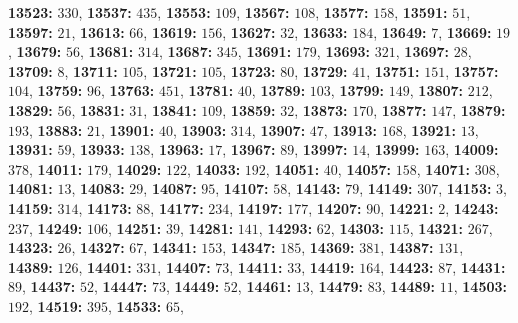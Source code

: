 \textsf{\bfseries 13523:} $330$, \textsf{\bfseries 13537:} $435$, \textsf{\bfseries 13553:} $109$, \textsf{\bfseries 13567:} $108$, \textsf{\bfseries 13577:} $158$, \textsf{\bfseries 13591:} $51$, \textsf{\bfseries 13597:} $21$, \textsf{\bfseries 13613:} $66$, \textsf{\bfseries 13619:} $156$, \textsf{\bfseries 13627:} $32$, \textsf{\bfseries 13633:} $184$, \textsf{\bfseries 13649:} $7$, \textsf{\bfseries 13669:} $19$, \textsf{\bfseries 13679:} $56$, \textsf{\bfseries 13681:} $314$, \textsf{\bfseries 13687:} $345$, \textsf{\bfseries 13691:} $179$, \textsf{\bfseries 13693:} $321$, \textsf{\bfseries 13697:} $28$, \textsf{\bfseries 13709:} $8$, \textsf{\bfseries 13711:} $105$, \textsf{\bfseries 13721:} $105$, \textsf{\bfseries 13723:} $80$, \textsf{\bfseries 13729:} $41$, \textsf{\bfseries 13751:} $151$, \textsf{\bfseries 13757:} $104$, \textsf{\bfseries 13759:} $96$, \textsf{\bfseries 13763:} $451$, \textsf{\bfseries 13781:} $40$, \textsf{\bfseries 13789:} $103$, \textsf{\bfseries 13799:} $149$, \textsf{\bfseries 13807:} $212$, \textsf{\bfseries 13829:} $56$, \textsf{\bfseries 13831:} $31$, \textsf{\bfseries 13841:} $109$, \textsf{\bfseries 13859:} $32$, \textsf{\bfseries 13873:} $170$, \textsf{\bfseries 13877:} $147$, \textsf{\bfseries 13879:} $193$, \textsf{\bfseries 13883:} $21$, \textsf{\bfseries 13901:} $40$, \textsf{\bfseries 13903:} $314$, \textsf{\bfseries 13907:} $47$, \textsf{\bfseries 13913:} $168$, \textsf{\bfseries 13921:} $13$, \textsf{\bfseries 13931:} $59$, \textsf{\bfseries 13933:} $138$, \textsf{\bfseries 13963:} $17$, \textsf{\bfseries 13967:} $89$, \textsf{\bfseries 13997:} $14$, \textsf{\bfseries 13999:} $163$, \textsf{\bfseries 14009:} $378$, \textsf{\bfseries 14011:} $179$, \textsf{\bfseries 14029:} $122$, \textsf{\bfseries 14033:} $192$, \textsf{\bfseries 14051:} $40$, \textsf{\bfseries 14057:} $158$, \textsf{\bfseries 14071:} $308$, \textsf{\bfseries 14081:} $13$, \textsf{\bfseries 14083:} $29$, \textsf{\bfseries 14087:} $95$, \textsf{\bfseries 14107:} $58$, \textsf{\bfseries 14143:} $79$, \textsf{\bfseries 14149:} $307$, \textsf{\bfseries 14153:} $3$, \textsf{\bfseries 14159:} $314$, \textsf{\bfseries 14173:} $88$, \textsf{\bfseries 14177:} $234$, \textsf{\bfseries 14197:} $177$, \textsf{\bfseries 14207:} $90$, \textsf{\bfseries 14221:} $2$, \textsf{\bfseries 14243:} $237$, \textsf{\bfseries 14249:} $106$, \textsf{\bfseries 14251:} $39$, \textsf{\bfseries 14281:} $141$, \textsf{\bfseries 14293:} $62$, \textsf{\bfseries 14303:} $115$, \textsf{\bfseries 14321:} $267$, \textsf{\bfseries 14323:} $26$, \textsf{\bfseries 14327:} $67$, \textsf{\bfseries 14341:} $153$, \textsf{\bfseries 14347:} $185$, \textsf{\bfseries 14369:} $381$, \textsf{\bfseries 14387:} $131$, \textsf{\bfseries 14389:} $126$, \textsf{\bfseries 14401:} $331$, \textsf{\bfseries 14407:} $73$, \textsf{\bfseries 14411:} $33$, \textsf{\bfseries 14419:} $164$, \textsf{\bfseries 14423:} $87$, \textsf{\bfseries 14431:} $89$, \textsf{\bfseries 14437:} $52$, \textsf{\bfseries 14447:} $73$, \textsf{\bfseries 14449:} $52$, \textsf{\bfseries 14461:} $13$, \textsf{\bfseries 14479:} $83$, \textsf{\bfseries 14489:} $11$, \textsf{\bfseries 14503:} $192$, \textsf{\bfseries 14519:} $395$, \textsf{\bfseries 14533:} $65$, 
